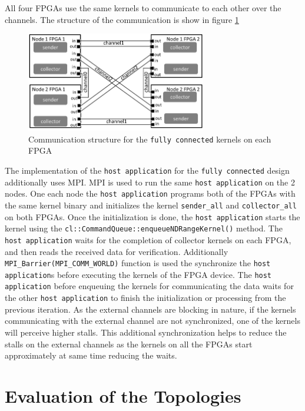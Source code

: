All four FPGAs use the same kernels to communicate to each other over the channels.
The structure of the communication is show in figure \ref{fig:fc_struc}

\begin{figure}[h]%
    \centering
    \includegraphics[width=0.7\textwidth]{images/fc_struc}
    \caption{Communication structure for the \texttt{fully connected} kernels on each FPGA}
    \label{fig:fc_struc}
\end{figure}

The implementation of the \texttt{host application} for the \texttt{fully connected} design additionally
uses MPI. MPI is used to run the same \texttt{host application} on the 2 nodes. One each node
the \texttt{host application} programs both of the FPGAs with the same kernel binary and initializes
the kernel \texttt{sender\_all} and \texttt{collector\_all} on both FPGAs. Once the initialization
is done, the \texttt{host application} starts the kernel using the \texttt{cl::CommandQueue::enqueueNDRangeKernel()}
method. The \texttt{host application} waits for the completion of collector kernels on each FPGA, and then reads
the received data for verification. Additionally \texttt{MPI\_Barrier(MPI\_COMM\_WORLD)} function
is used the synchronize the \texttt{host application}s before executing the kernels of the FPGA device.
The \texttt{host application} before enqueuing the kernels for communicating the data waits
for the other \texttt{host application} to finish the initialization or processing from the previous
iteration. As the external channels are blocking in nature, if the kernels communicating
with the external channel are not synchronized, one of the kernels will perceive higher stalls.
This additional synchronization helps to reduce the stalls on the external channels
as the kernels on all the FPGAs start approximately at same time reducing the waits.


\section{Evaluation of the Topologies}
\label{sec:top_eval}

